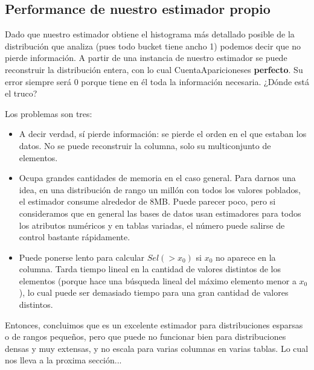 \subsection{Performance de nuestro estimador propio}
Dado que nuestro estimador obtiene el histograma más detallado posible de la distribución que analiza (pues todo bucket tiene ancho 1) podemos decir que no pierde información. A partir de una instancia de nuestro estimador se puede reconstruir la distribución entera, con lo cual CuentaApariciones\texttrademark es \textbf{perfecto}. Su error siempre será 0 porque tiene en él toda la información necesaria. ¿Dónde está el truco?

Los problemas son tres:
\begin{itemize}
 \item A decir verdad, sí pierde información: se pierde el orden en el que estaban los datos. No se puede reconstruir la columna, solo su multiconjunto de elementos.
 \item Ocupa grandes cantidades de memoria en el caso general. Para darnos una idea, en una distribución de rango un millón con todos los valores poblados, el estimador consume alrededor de 8MB. Puede parecer poco, pero si consideramos que en general las bases de datos usan estimadores para todos los atributos numéricos y en tablas variadas, el número puede salirse de control bastante rápidamente.
 \item Puede ponerse lento para calcular $Sel(>x_0)$ si $x_0$ no aparece en la columna. Tarda tiempo lineal en la cantidad de valores distintos de los elementos (porque hace una búsqueda lineal del máximo elemento menor a $x_0$), lo cual puede ser demasiado tiempo para una gran cantidad de valores distintos.
\end{itemize}

Entonces, concluimos que es un excelente estimador para distribuciones esparsas o de rangos pequeños, pero que puede no funcionar bien para distribuciones densas y muy extensas, y no escala para varias columnas en varias tablas. Lo cual nos lleva a la proxima sección...

